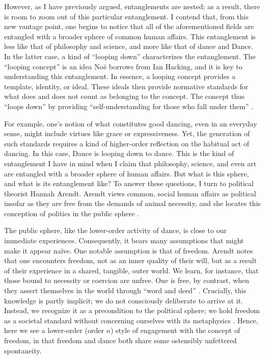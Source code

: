 \documentclass[12pt,letterpaper]{article}
\begin{document}
However, as I have previously argued, entanglements are nested; as a result,
there is room to zoom out of this particular entanglement. I contend that, from
this new vantage point, one begins to notice that all of the aforementioned
fields are entangled with a broader sphere of common human affairs. This
entanglement is less like that of philosophy and science, and more like that of
dance and Dance. In the latter case, a kind of ``looping down'' characterizes
the entanglement. The ``looping concept'' is an idea Noë borrows from Ian
Hacking, and it is key to understanding this entanglement. In essence, a looping
concept provides a template, identity, or ideal. These ideals then provide
normative standards for what does and does not count as belonging to the
concept. The concept thus ``loops down'' by providing ``self-understanding for
those who fall under them'' \autocite[153]{noeEntanglement2023}.

For example, one's notion of what constitutes good dancing, even in an everyday
sense, might include virtues like grace or expressiveness. Yet, the generation
of such standards requires a kind of higher-order reflection on the habitual act
of dancing. In this case, Dance is looping down to dance. This is the kind of
entanglement I have in mind when I claim that philosophy, science, and even art
are entangled with a broader sphere of human affairs. But what is this sphere,
and what is its entanglement like? To answer these questions, I turn to
political theorist Hannah Arendt. Arendt views common, social human affairs as
political insofar as they are free from the demands of animal necessity, and she
locates this conception of politics in the public sphere
\autocite[157]{arendtPromise2009}.

The public sphere, like the lower-order activity of dance, is close to our
immediate experiences. Consequently, it bears many assumptions that might make
it appear naïve. One notable assumption is that of freedom. Arendt notes that
one encounters freedom, not as an inner quality of their will, but as a result
of their experience in a shared, tangible, outer world. We learn, for instance,
that those bound to necessity or coercion are unfree. One is free, by contrast,
when they assert themselves in the world through ``word and deed''
\autocite[148]{arendtFuture1968}. Crucially, this knowledge is partly implicit;
we do not consciously deliberate to arrive at it. Instead, we recognize it as a
precondition to the political sphere; we hold freedom as a societal standard
without concerning ourselves with its metaphysics
\autocite[152]{arendtFuture1968}. Hence, here we see a lower-order (order $n$)
style of engagement with the concept of freedom, in that freedom and dance both
share some ostensibly unfettered spontaneity.
\end{document}
